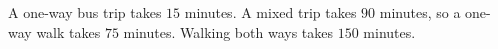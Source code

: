 A one-way bus trip takes $15$ minutes. A mixed trip takes $90$ minutes, so a one-way walk takes $75$ minutes. Walking both ways takes $\boxed{150}$ minutes.
